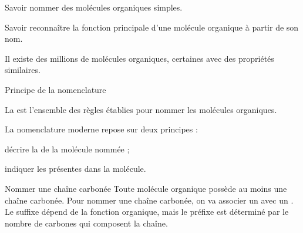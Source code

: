 \tetePremStssOrga
{}

\begin{objectifs}
  \item Savoir nommer des molécules organiques simples.
  \item Savoir reconnaître la fonction principale d'une molécule organique à partir de son nom.
\end{objectifs}

\begin{contexte}
  Il existe des millions de molécules organiques, certaines avec des propriétés similaires.

\end{contexte}


\begin{doc}{Principe de la nomenclature}
  \begin{importants}  
    La  est l'ensemble des règles établies pour nommer les molécules organiques.
  \end{importants}
   
  La nomenclature moderne repose sur deux principes :
  \begin{listePoints}
    \item décrire la  de la molécule nommée ;
    \item indiquer les  présentes dans la molécule.
  \end{listePoints}
\end{doc}

\begin{doc}{Nommer une chaîne carbonée}
  Toute molécule organique possède au moins une chaîne carbonée.
  Pour nommer une chaîne carbonée, on va associer un  avec un .
  Le suffixe dépend de la fonction organique, mais le préfixe est déterminé par le nombre de carbones qui composent la chaîne.
  
\end{doc}


